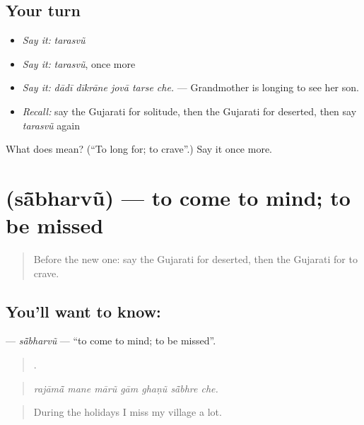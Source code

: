 \subsection*{Your turn}
\begin{itemize}
\raggedright
  \item \emph{Say it:} \emph{tarasvũ}
  \item \emph{Say it:} \emph{tarasvũ}, once more
  \item \emph{Say it:} \emph{dādī dīkrāne jovā tarse che.} — Grandmother is longing to see her son.
  \item \emph{Recall:} say the Gujarati for solitude, then the Gujarati for deserted, then say \emph{tarasvũ} again
\end{itemize}

\begin{tcolorbox}[breakable,colback=teal!4,colframe=teal!35!black,title={Before you move on}]
What does  mean? (\textquotedblleft{}To long for; to crave\textquotedblright{}.) Say it once more.
\end{tcolorbox}
\section[\texorpdfstring{\gu{સાંભરવું} (sā̃bharvũ)}{સાંભરવું (sā̃bharvũ)}]{ (sā̃bharvũ) — to come to mind; to be missed}

\label{lesson:GU-C458-sabharvu}



\begin{quote}
Before the new one: say the Gujarati for deserted, then the Gujarati for to crave.
\end{quote}

\subsection*{You'll want to know: }
\textbf{} — \emph{sā̃bharvũ} — \textquotedblleft{}to come to mind; to be missed\textquotedblright{}.

\begin{quote}
      .
\end{quote}

\begin{quote}
\emph{rajāmā̃ mane mārũ gām ghaṇũ sā̃bhre che.}
\end{quote}

\begin{quote}
During the holidays I miss my village a lot.
\end{quote}

